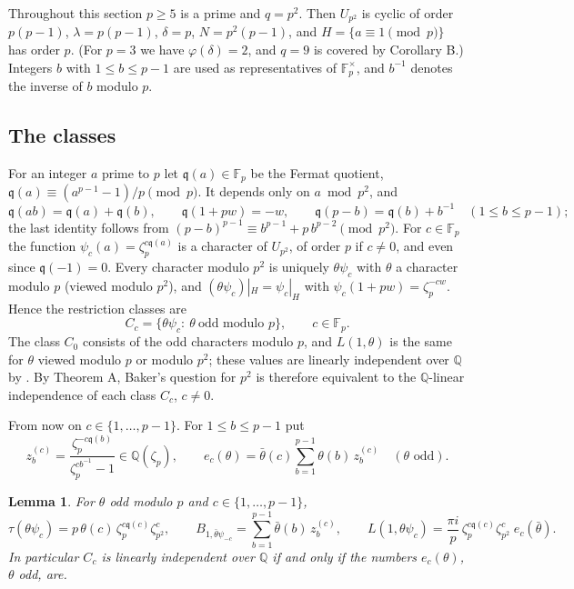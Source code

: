 \documentclass[11pt]{amsart}
\newtheorem{lemma}[theorem]{Lemma}
\theoremstyle{definition}
\theoremstyle{remark}
\providecommand{\Q}{\mathbb Q}
\providecommand{\F}{\mathbb F}
\newcommand{\fq}{\mathfrak q}
\numberwithin{equation}{section}
\begin{document}
Throughout this section $p\ge5$ is a prime and $q=p^2$.
Then $U_{p^2}$ is cyclic of order $p(p-1)$, $\lambda=p(p-1)$, $\delta=p$, $N=p^2(p-1)$, and $H=\{a\equiv1\pmod p\}$ has order $p$.
(For $p=3$ we have $\varphi(\delta)=2$, and $q=9$ is covered by Corollary B.)
Integers $b$ with $1\le b\le p-1$ are used as representatives of $\F_p^\times$, and $b^{-1}$ denotes the inverse of $b$ modulo $p$.

\subsection{The classes}
For an integer $a$ prime to $p$ let $\fq(a)\in\F_p$ be the Fermat quotient, $\fq(a)\equiv(a^{p-1}-1)/p\pmod p$.
It depends only on $a\bmod p^2$, and
\begin{equation}\label{eq:fq}
\fq(ab)=\fq(a)+\fq(b),\qquad \fq(1+pw)=-w,\qquad \fq(p-b)=\fq(b)+b^{-1}\quad(1\le b\le p-1);
\end{equation}
the last identity follows from $(p-b)^{p-1}\equiv b^{p-1}+p\,b^{p-2}\pmod{p^2}$.
For $c\in\F_p$ the function $\psi_c(a)=\zeta_p^{c\fq(a)}$ is a character of $U_{p^2}$, of order $p$ if $c\ne0$, and even since $\fq(-1)=0$.
Every character modulo $p^2$ is uniquely $\theta\psi_c$ with $\theta$ a character modulo $p$ (viewed modulo $p^2$), and $(\theta\psi_c)|_H=\psi_c|_H$ with $\psi_c(1+pw)=\zeta_p^{-cw}$.
Hence the restriction classes are
\[
C_c=\{\theta\psi_c:\ \theta\ \text{odd modulo }p\},\qquad c\in\F_p .
\]
The class $C_0$ consists of the odd characters modulo $p$, and $L(1,\theta)$ is the same for $\theta$ viewed modulo $p$ or modulo $p^2$; these values are linearly independent over $\Q$ by \cite{BBW73}.
By Theorem A, Baker's question for $p^2$ is therefore equivalent to the $\Q$-linear independence of each class $C_c$, $c\ne0$.

From now on $c\in\{1,\dots,p-1\}$.
For $1\le b\le p-1$ put
\[
z_b^{(c)}=\frac{\zeta_p^{-c\fq(b)}}{\zeta_p^{cb^{-1}}-1}\in\Q(\zeta_p),\qquad
e_c(\theta)=\bar\theta(c)\sum_{b=1}^{p-1}\theta(b)\,z_b^{(c)}\quad(\theta\text{ odd}).
\]

\begin{lemma}\label{lem:classformula}
For $\theta$ odd modulo $p$ and $c\in\{1,\dots,p-1\}$,
\[
\tau(\theta\psi_c)=p\,\theta(c)\,\zeta_p^{c\fq(c)}\zeta_{p^2}^{c},\qquad
B_{1,\bar\theta\psi_{-c}}=\sum_{b=1}^{p-1}\bar\theta(b)\,z_b^{(c)},\qquad
L(1,\theta\psi_c)=\frac{\pi i}{p}\,\zeta_p^{c\fq(c)}\zeta_{p^2}^{c}\;e_c(\bar\theta).
\]
In particular $C_c$ is linearly independent over $\Q$ if and only if the numbers $e_c(\theta)$, $\theta$ odd, are.
\end{lemma}
\end{document}
